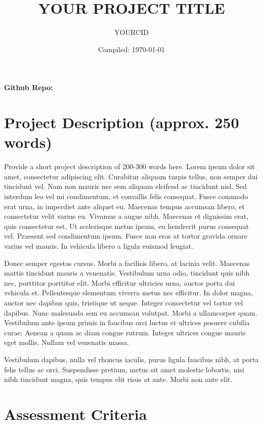 \documentclass[a4paper, 12pt]{article}
\title{YOUR PROJECT TITLE}
\author{YOURCID}
\date{Compiled: \today}
\begin{document}
\maketitle

\textbf{Github Repo:} \href{https://github.com/zakvarty/eds-notes-quarto/releases/tag/v1.2.0-alpha}{\color{blue}{REPLACE-WITH-LINK-TO-YOUR-TAGGED-RELEASE}}

\section{Project Description (approx. 250 words)}


Provide a short project description of 200-300 words here. Lorem ipsum dolor sit amet, consectetur adipiscing elit. Curabitur aliquam turpis tellus, non semper dui tincidunt vel. Nam non mauris nec sem aliquam eleifend ac tincidunt nisl. Sed interdum leo vel mi condimentum, et convallis felis consequat. Fusce commodo erat urna, in imperdiet ante aliquet eu. Maecenas tempus accumsan libero, et consectetur velit varius eu. Vivamus a augue nibh. Maecenas et dignissim erat, quis consectetur est. Ut scelerisque metus ipsum, eu hendrerit purus consequat vel. Praesent sed condimentum ipsum. Fusce non eros at tortor gravida ornare varius vel mauris. In vehicula libero a ligula euismod feugiat.

Donec semper egestas cursus. Morbi a facilisis libero, at lacinia velit. Maecenas mattis tincidunt mauris a venenatis. Vestibulum urna odio, tincidunt quis nibh nec, porttitor porttitor elit. Morbi efficitur ultricies urna, auctor porta dui vehicula et. Pellentesque elementum viverra metus nec efficitur. In dolor magna, auctor nec dapibus quis, tristique ut neque. Integer consectetur vel tortor vel dapibus. Nunc malesuada sem eu accumsan volutpat. Morbi a ullamcorper quam. Vestibulum ante ipsum primis in faucibus orci luctus et ultrices posuere cubilia curae; Aenean a quam ac diam congue rutrum. Integer ultrices congue mauris eget mollis. Nullam vel venenatis massa.

Vestibulum dapibus, nulla vel rhoncus iaculis, purus ligula faucibus nibh, at porta felis tellus ac orci. Suspendisse pretium, metus sit amet molestie lobortis, nisi nibh tincidunt magna, quis tempus elit risus at ante. Morbi non ante elit. 

\pagebreak

\section{Assessment Criteria}
\end{document}

